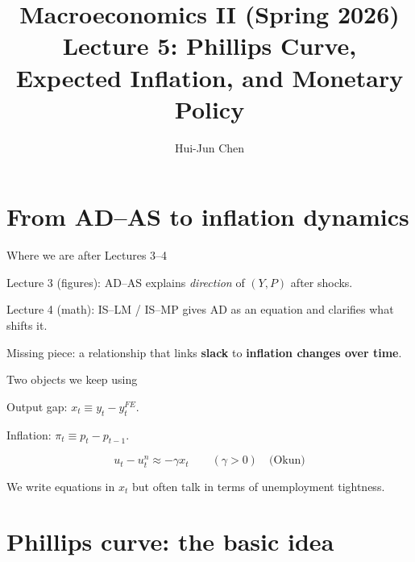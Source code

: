 \documentclass[aspectratio=169,xcolor=dvipsnames]{beamer}
\title[Phillips Curve \& Policy]{Macroeconomics II (Spring 2026)\\\vspace{4pt}Lecture 5: Phillips Curve, Expected Inflation, and Monetary Policy}
\author[Hui-Jun Chen]{Hui-Jun Chen}
\institute[]{National Tsing Hua University}
\date{}
\let\tempone\itemize
\let\temptwo\enditemize
\renewenvironment{itemize}{\tempone\addtolength{\itemsep}{\fill}}{\temptwo}
\begin{document}
\begin{frame}
    \titlepage
\end{frame}

\section{From AD--AS to inflation dynamics}

\begin{frame}{Where we are after Lectures 3--4}
\begin{itemize}
\item Lecture 3 (figures): AD--AS explains \emph{direction} of $(Y,P)$ after shocks.
\item Lecture 4 (math): IS--LM / IS--MP gives AD as an equation and clarifies what shifts it.
\item Missing piece: a relationship that links \textbf{slack} to \textbf{inflation changes over time}.
\end{itemize}
\end{frame}

\begin{frame}{Two objects we keep using}
\begin{itemize}
\item Output gap: $x_t \equiv y_t-y_t^{FE}$.
\item Inflation: $\pi_t \equiv p_t-p_{t-1}$.
\end{itemize}

\vspace{0.2em}
\[
u_t-u_t^n \approx -\gamma x_t
\qquad (\gamma>0)\quad\text{(Okun)}
\]

\begin{itemize}
\item We write equations in $x_t$ but often talk in terms of unemployment tightness.
\end{itemize}
\end{frame}

\section{Phillips curve: the basic idea}
\end{document}
